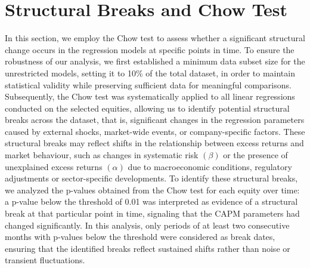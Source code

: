 \section{Structural Breaks and Chow Test}

In this section, we employ the Chow test to assess whether a significant structural change occurs in the regression models at 
specific points in time. 
To ensure the robustness of our analysis, we first established a minimum data subset size for the unrestricted models, 
setting it to 10\% of the total dataset, in order to maintain statistical validity while preserving sufficient data for
meaningful comparisons.
Subsequently, the Chow test was systematically applied to all linear regressions conducted on the selected equities, 
allowing us to identify potential structural breaks across the dataset, that is, significant changes in the regression
parameters caused by external shocks, market-wide events, or company-specific factors. 
These structural breaks may reflect shifts in the relationship between excess returns and market behaviour, such as changes in
systematic risk $(\beta)$ or the presence of unexplained excess returns $(\alpha)$ due to macroeconomic conditions, regulatory 
adjustments or sector-specific developments.
To identify these structural breaks, we analyzed the p-values obtained from the Chow test for each equity over time: 
a p-value below the threshold of 0.01 was interpreted as evidence of a structural break at that particular point in time,
signaling that the CAPM parameters had changed significantly.
In this analysis, only periods of at least two consecutive months with p-values below the threshold were considered as
break dates, ensuring that the identified breaks reflect sustained shifts rather than noise or transient fluctuations.

